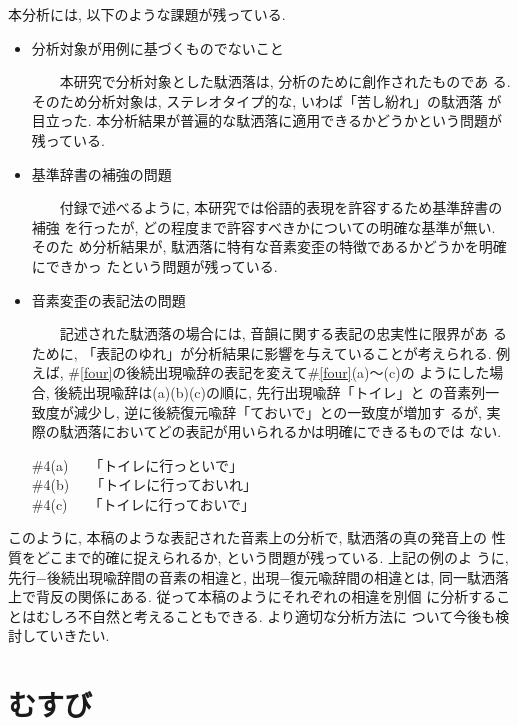 本分析には, 以下のような課題が残っている. 

\begin{itemize}
\item 分析対象が用例に基づくものでないこと

\ \ \ \ 本研究で分析対象とした駄洒落は, 分析のために創作されたものであ
る. そのため分析対象は, ステレオタイプ的な, いわば「苦し紛れ」の駄洒落
が目立った. 本分析結果が普遍的な駄洒落に適用できるかどうかという問題が
残っている.

\item 基準辞書の補強の問題

\ \ \ \ 付録で述べるように, 本研究では俗語的表現を許容するため基準辞書の補強
を行ったが, どの程度まで許容すべきかについての明確な基準が無い. そのた
め分析結果が, 駄洒落に特有な音素変歪の特徴であるかどうかを明確にできかっ
たという問題が残っている.  

\item 音素変歪の表記法の問題

\ \ \ \ 記述された駄洒落の場合には, 音韻に関する表記の忠実性に限界があ
るために, 「表記のゆれ」が分析結果に影響を与えていることが考えられる. 
例えば, \#\ref{four}の後続出現喩辞の表記を変えて\#\ref{four}(a)〜(c)の
ようにした場合, 後続出現喩辞は(a)(b)(c)の順に, 先行出現喩辞「トイレ」と
の音素列一致度が減少し, 逆に後続復元喩辞「ておいで」との一致度が増加す
るが, 実際の駄洒落においてどの表記が用いられるかは明確にできるものでは
ない. 

\vspace*{1em}
\hspace*{1em}\#4(a)\ \ \ 「トイレに行っといで」\\
\hspace*{1em}\#4(b)\ \ \ 「トイレに行っておいれ」\\
\hspace*{1em}\#4(c)\ \ \ 「トイレに行っておいで」\\
\end{itemize}
このように, 本稿のような表記された音素上の分析で, 駄洒落の真の発音上の
性質をどこまで的確に捉えられるか, という問題が残っている. 上記の例のよ
うに, 先行−後続出現喩辞間の音素の相違と, 出現−復元喩辞間の相違とは, 
同一駄洒落上で背反の関係にある. 従って本稿のようにそれぞれの相違を別個
に分析することはむしろ不自然と考えることもできる. より適切な分析方法に
ついて今後も検討していきたい.  

\section{むすび}

